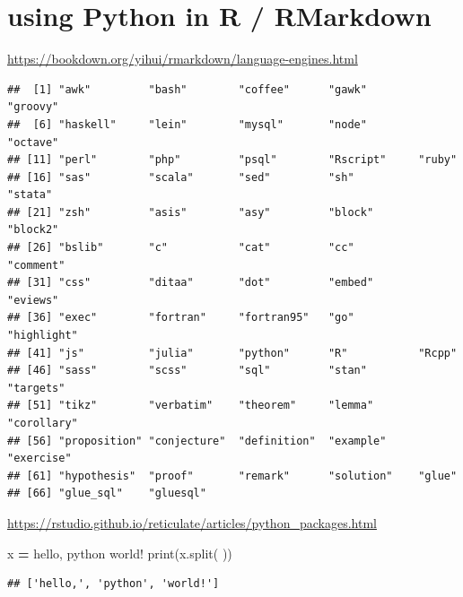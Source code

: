 \documentclass[
]{book}
\newenvironment{Shaded}{\begin{snugshade}}{\end{snugshade}}
\newcommand{\BuiltInTok}[1]{#1}
\newcommand{\FunctionTok}[1]{\textcolor[rgb]{0.13,0.29,0.53}{\textbf{#1}}}
\newcommand{\NormalTok}[1]{#1}
\newcommand{\OperatorTok}[1]{\textcolor[rgb]{0.81,0.36,0.00}{\textbf{#1}}}
\newcommand{\SpecialCharTok}[1]{\textcolor[rgb]{0.81,0.36,0.00}{\textbf{#1}}}
\newcommand{\StringTok}[1]{\textcolor[rgb]{0.31,0.60,0.02}{#1}}
\theoremstyle{definition}
\theoremstyle{definition}
\theoremstyle{definition}
\theoremstyle{definition}
\theoremstyle{remark}
\begin{document}
\section{using Python in R / RMarkdown}\label{using-python-in-r-rmarkdown}

\url{https://bookdown.org/yihui/rmarkdown/language-engines.html}

\begin{Shaded}
\end{Shaded}

\begin{verbatim}
##  [1] "awk"         "bash"        "coffee"      "gawk"        "groovy"     
##  [6] "haskell"     "lein"        "mysql"       "node"        "octave"     
## [11] "perl"        "php"         "psql"        "Rscript"     "ruby"       
## [16] "sas"         "scala"       "sed"         "sh"          "stata"      
## [21] "zsh"         "asis"        "asy"         "block"       "block2"     
## [26] "bslib"       "c"           "cat"         "cc"          "comment"    
## [31] "css"         "ditaa"       "dot"         "embed"       "eviews"     
## [36] "exec"        "fortran"     "fortran95"   "go"          "highlight"  
## [41] "js"          "julia"       "python"      "R"           "Rcpp"       
## [46] "sass"        "scss"        "sql"         "stan"        "targets"    
## [51] "tikz"        "verbatim"    "theorem"     "lemma"       "corollary"  
## [56] "proposition" "conjecture"  "definition"  "example"     "exercise"   
## [61] "hypothesis"  "proof"       "remark"      "solution"    "glue"       
## [66] "glue_sql"    "gluesql"
\end{verbatim}

\url{https://rstudio.github.io/reticulate/articles/python_packages.html}

\begin{Shaded}
\begin{Highlighting}[]
\NormalTok{x }\OperatorTok{=} \StringTok{\textquotesingle{}hello, python world!\textquotesingle{}}
\BuiltInTok{print}\NormalTok{(x.split(}\StringTok{\textquotesingle{} \textquotesingle{}}\NormalTok{))}
\end{Highlighting}
\end{Shaded}

\begin{verbatim}
## ['hello,', 'python', 'world!']
\end{verbatim}
\end{document}

